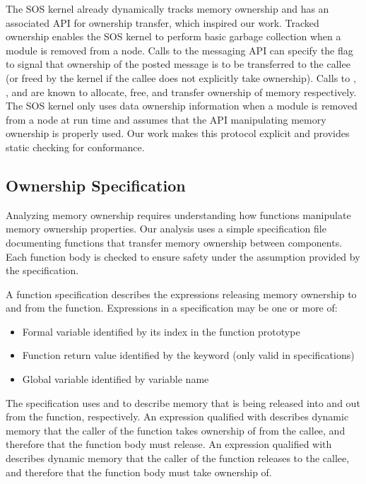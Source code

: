 The SOS kernel already dynamically tracks memory ownership and has an
associated API for ownership transfer, which inspired our work.  
%
Tracked ownership enables the SOS kernel to perform basic garbage collection
when a module is removed from a node.
%
Calls to the messaging API can specify the  flag to
signal that ownership of the posted message is to be transferred to the callee
(or freed by the kernel if the callee does not explicitly take ownership).  
%
Calls to , , and 
are known to allocate, free, and transfer ownership of memory respectively.
%
The SOS kernel only uses data ownership information when a module is removed
from a node at run time and assumes that the API manipulating memory ownership
is properly used.
%
Our work makes this protocol explicit and provides static checking for
conformance.



\subsection{Ownership Specification}


%  
%  



Analyzing memory ownership requires understanding how functions manipulate
memory ownership properties.
%
Our analysis uses a simple specification file documenting functions that
transfer memory ownership between components.
%
Each function body is checked to ensure safety under the assumption provided
by the specification.  



A function specification describes the expressions releasing memory ownership
to and from the function.
%
Expressions in a specification may be one or more of: 
%
\begin{itemize}
%
\item Formal variable identified by its index in the function prototype
%
\item Function return value identified by the keyword  (only
valid in  specifications)
%
\item Global variable identified by variable name
%
\end{itemize}
%
The specification uses  and  to describe memory
that is being released into and out from the function, respectively.
%
An  expression qualified with  describes dynamic
memory that the caller of the function takes ownership of from the callee, and
therefore that the function body must release.
%
An  expression qualified with  describes dynamic
memory that the caller of the function releases to the callee, and therefore
that the function body must take ownership of.




